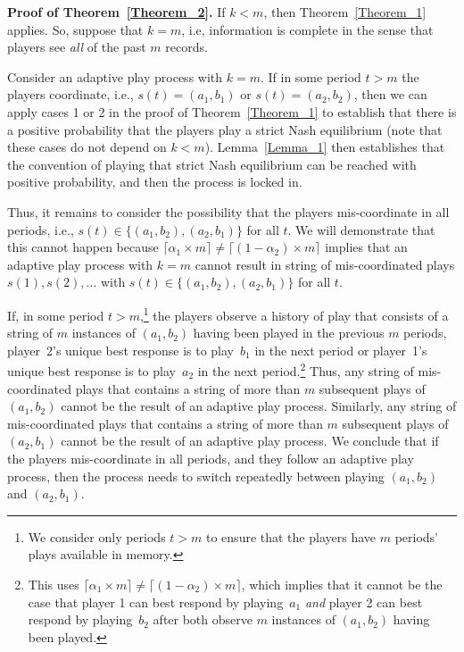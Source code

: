 \documentclass[11.5pt]{article}
\begin{document}
\textbf{Proof of Theorem~\ref{Theorem_2}.}
If $k<m$, then Theorem~\ref{Theorem_1} applies. So, suppose that $k=m$, i.e, information is complete in the sense that players see \emph{all} of the past $m$ records.  

Consider an adaptive play process with $k=m$. If in some period $t>m$ the players coordinate, i.e., $s(t)=(a_1,b_1)$ or $s(t)=(a_2,b_2)$, then we can apply cases 1 or 2 in the proof of Theorem~\ref{Theorem_1} to establish that there is a positive probability that the players play a strict Nash equilibrium (note that these cases do not depend on $k < m$). 
Lemma~\ref{Lemma_1} then establishes that the convention of playing that strict Nash equilibrium can be reached with positive probability, and then the process is locked in.

Thus, it remains to consider the possibility that the players mis-coordinate in all periods, i.e., $s(t)\in \{(a_1,b_2),(a_2,b_1)\}$ for all $t$. We will demonstrate that this cannot happen because $\lceil \alpha_1\times m\rceil \neq\lceil (1-\alpha_2)\times m\rceil$ implies that an adaptive play process with $k=m$ cannot result in string of mis-coordinated plays $s(1),s(2), \ldots $ with $s(t)\in \{(a_1,b_2),(a_2,b_1)\}$ for all $t$. 
%

If, in some period $t>m$,\footnote{We consider only periods $t>m$ to ensure that the players have $m$ periods' plays available in memory.} 
 the players observe a history of play that consists of a string of $m$ instances of $(a_1,b_2)$ having been played in the previous $m$ periods, player~2's unique best response is to play~$b_1$ in the next period or player~1's unique best response is to play~$a_2$ in the next period.\footnote{This uses $\lceil \alpha_1\times m\rceil \neq\lceil (1-\alpha_2)\times m\rceil$, which implies that it cannot be the case that player 1 can best respond by playing~$a_1$ \emph{and} player 2 can best respond by playing~$b_2$ after both observe $m$ instances of $(a_1,b_2)$ having been played.} 
%
Thus, any string of mis-coordinated plays that contains a string of more than $m$ subsequent plays of $(a_1,b_2)$ cannot be the result of an adaptive play process. 
%
Similarly, any string of mis-coordinated plays that contains a string of more than $m$ subsequent plays of $(a_2,b_1)$ cannot be the result of an adaptive play process. 
%
We conclude that if the players mis-coordinate in all periods, and they follow an adaptive play process, then the process needs to switch repeatedly between playing $(a_1,b_2)$ and $(a_2,b_1)$. 
%
\end{document}
